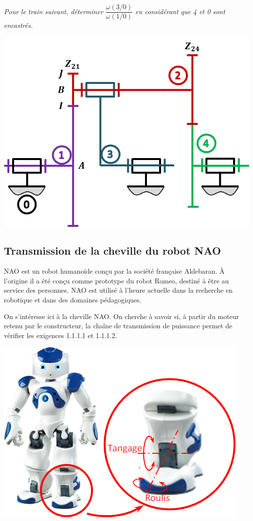 \documentclass[10pt,fleqn]{article} %
\begin{document}
\begin{multicols}{2}
\subparagraph{}\textit{Pour le train suivant, déterminer $\dfrac{\omega(3/0)}{\omega(1/0)}$ en considérant que 4 et 0 sont encastrés.}

\begin{center}
\includegraphics[width=\linewidth]{images/train_04}
\end{center}



\subsection*{Transmission de la cheville du robot NAO}

NAO est un robot humanoïde conçu par la société française Aldebaran. \`A l'origine il a été conçu comme prototype du robot Romeo, destiné à être au service des personnes. NAO est utilisé à l'heure actuelle dans la recherche en robotique et dans des domaines pédagogiques. 
\begin{obj}
On s'intéresse ici à la cheville NAO. On cherche à savoir si, à partir du moteur retenu par le constructeur, la chaîne de transmission de puissance permet de vérifier les exigences 1.1.1.1 et 1.1.1.2.
\end{obj}

\begin{center}
\includegraphics[width=.95\linewidth]{images/Cheville}
\end{center}



\end{multicols}
\end{document}
